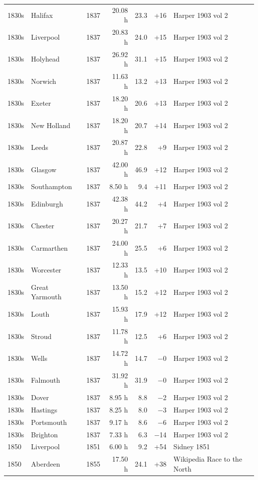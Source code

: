 \documentclass[11pt,a4paper]{article}
\begin{document}
{\begin{longtable}{llrrrrp{5.2cm}}
1830s & Halifax & 1837 & 20.08 h & 23.3 & +16 & Harper 1903 vol 2\\
1830s & Liverpool & 1837 & 20.83 h & 24.0 & +15 & Harper 1903 vol 2\\
1830s & Holyhead & 1837 & 26.92 h & 31.1 & +15 & Harper 1903 vol 2\\
1830s & Norwich & 1837 & 11.63 h & 13.2 & +13 & Harper 1903 vol 2\\
1830s & Exeter & 1837 & 18.20 h & 20.6 & +13 & Harper 1903 vol 2\\
1830s & New Holland & 1837 & 18.20 h & 20.7 & +14 & Harper 1903 vol 2\\
1830s & Leeds & 1837 & 20.87 h & 22.8 & +9 & Harper 1903 vol 2\\
1830s & Glasgow & 1837 & 42.00 h & 46.9 & +12 & Harper 1903 vol 2\\
1830s & Southampton & 1837 & 8.50 h & 9.4 & +11 & Harper 1903 vol 2\\
1830s & Edinburgh & 1837 & 42.38 h & 44.2 & +4 & Harper 1903 vol 2\\
1830s & Chester & 1837 & 20.27 h & 21.7 & +7 & Harper 1903 vol 2\\
1830s & Carmarthen & 1837 & 24.00 h & 25.5 & +6 & Harper 1903 vol 2\\
1830s & Worcester & 1837 & 12.33 h & 13.5 & +10 & Harper 1903 vol 2\\
1830s & Great Yarmouth & 1837 & 13.50 h & 15.2 & +12 & Harper 1903 vol 2\\
1830s & Louth & 1837 & 15.93 h & 17.9 & +12 & Harper 1903 vol 2\\
1830s & Stroud & 1837 & 11.78 h & 12.5 & +6 & Harper 1903 vol 2\\
1830s & Wells & 1837 & 14.72 h & 14.7 & $-$0 & Harper 1903 vol 2\\
1830s & Falmouth & 1837 & 31.92 h & 31.9 & $-$0 & Harper 1903 vol 2\\
1830s & Dover & 1837 & 8.95 h & 8.8 & $-$2 & Harper 1903 vol 2\\
1830s & Hastings & 1837 & 8.25 h & 8.0 & $-$3 & Harper 1903 vol 2\\
1830s & Portsmouth & 1837 & 9.17 h & 8.6 & $-$6 & Harper 1903 vol 2\\
1830s & Brighton & 1837 & 7.33 h & 6.3 & $-$14 & Harper 1903 vol 2\\
1850 & Liverpool & 1851 & 6.00 h & 9.2 & +54 & Sidney 1851\\
1850 & Aberdeen & 1855 & 17.50 h & 24.1 & +38 & Wikipedia Race to the North\\

\end{longtable}}
\end{document}

